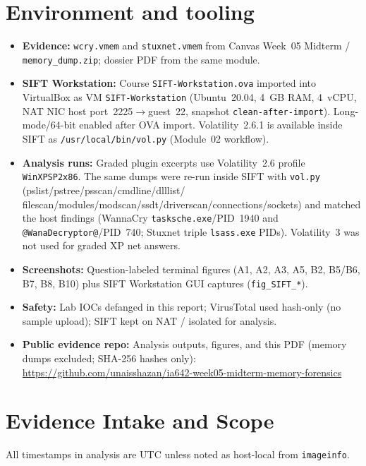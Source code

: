 \documentclass[11pt,letterpaper]{article}
\begin{document}
\section*{Environment and tooling}
\begin{itemize}
  \item \textbf{Evidence:} \texttt{wcry.vmem} and \texttt{stuxnet.vmem} from Canvas Week~05 Midterm /
        \texttt{memory\_dump.zip}; dossier PDF from the same module.
  \item \textbf{SIFT Workstation:} Course \texttt{SIFT-Workstation.ova} imported into VirtualBox as VM
        \texttt{SIFT-Workstation} (Ubuntu~20.04, 4~GB RAM, 4~vCPU, NAT NIC host port~2225$\rightarrow$guest~22,
        snapshot \texttt{clean-after-import}). Long-mode/64-bit enabled after OVA import.
        Volatility~2.6.1 is available inside SIFT as \texttt{/usr/local/bin/vol.py} (Module~02 workflow).
  \item \textbf{Analysis runs:} Graded plugin excerpts use Volatility~2.6 profile \texttt{WinXPSP2x86}.
        The same dumps were re-run inside SIFT with \texttt{vol.py} (pslist/pstree/psscan/cmdline/dlllist/
        filescan/modules/modscan/ssdt/driverscan/connections/sockets) and matched the host findings
        (WannaCry \texttt{tasksche.exe}/PID~1940 and \texttt{@WanaDecryptor@}/PID~740; Stuxnet triple
        \texttt{lsass.exe} PIDs). Volatility~3 was not used for graded XP net answers.
  \item \textbf{Screenshots:} Question-labeled terminal figures (A1, A2, A3, A5, B2, B5/B6, B7, B8, B10)
        plus SIFT Workstation GUI captures (\texttt{fig\_SIFT\_*}).
  \item \textbf{Safety:} Lab IOCs defanged in this report; VirusTotal used hash-only (no sample upload);
        SIFT kept on NAT / isolated for analysis.
  \item \textbf{Public evidence repo:} Analysis outputs, figures, and this PDF (memory dumps excluded;
        SHA-256 hashes only):
        \url{https://github.com/unaisshazan/ia642-week05-midterm-memory-forensics}
\end{itemize}

\section*{Evidence Intake and Scope}
All timestamps in analysis are UTC unless noted as host-local from \texttt{imageinfo}.
\end{document}
